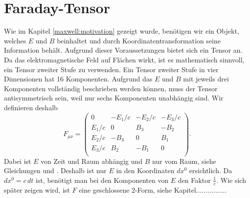 \section{Faraday-Tensor}
\label{maxwell:faraday}
Wie im Kapitel \ref{maxwell:motivation} gezeigt wurde, benötigen wir ein Objekt, welches $E$ und $B$ beinhaltet und durch Koordinatentransformation seine Information behält.
Aufgrund dieser Voraussetzungen bietet sich ein Tensor an.
Da das elektromagnetische Feld auf Flächen wirkt, ist es mathematisch sinnvoll, ein Tensor zweiter Stufe zu verwenden.
Ein Tensor zweiter Stufe in vier Dimensionen hat 16 Komponenten. Aufgrund das $E$ und $B$ mit jeweils drei Komponenten vollständig beschrieben werden können, muss der Tensor antisymmetrisch sein, weil nur sechs Komponenten unabhängig sind.
Wir definieren deshalb
\[
F_{\mu\nu}
= 
\begin{pmatrix}
	0 & -E_1/c & -E_2/c & -E_3/c \\
	E_1/c &  0 &  B_3 & -B_2 \\
	E_2/c & -B_3 &  0 &  B_1 \\
	E_3/c &  B_2 & -B_1 &  0 \\
\end{pmatrix}.
\]  
Dabei ist $E$ von Zeit und Raum abhängig und $B$ nur vom Raum, siehe Gleichungen  und .
Deshalb ist nur $E$ in den Koordinaten $dx^0$ ersichtlich.
Da $dx^0 = c \, dt$ ist, benötigt man bei den Komponenten von $E$ den Faktor $\frac{1}{c}$.
Wie sich später zeigen wird, ist $F$ eine geschlossene 2-Form, siehe Kapitel................





